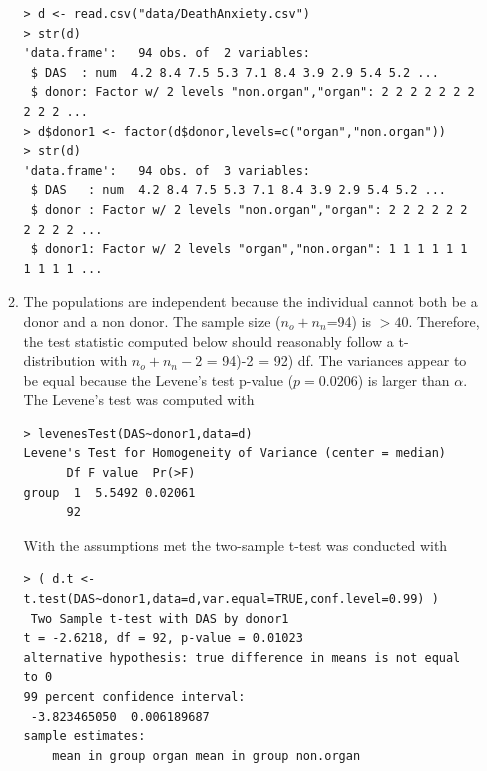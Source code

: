 \documentclass[10pt,openany]{book}\usepackage[]{graphicx}\usepackage[]{color}
\makeatletter
\newenvironment{kframe}{%
 \def\at@end@of@kframe{}%
 \ifinner\ifhmode%
  \def\at@end@of@kframe{\end{minipage}}%
  \begin{minipage}{\columnwidth}%
 \fi\fi%
 \def\FrameCommand##1{\hskip\@totalleftmargin \hskip-\fboxsep
 \colorbox{shadecolor}{##1}\hskip-\fboxsep
     \hskip-\linewidth \hskip-\@totalleftmargin \hskip\columnwidth}%
 \MakeFramed {\advance\hsize-\width
   \@totalleftmargin\z@ \linewidth\hsize
   \@setminipage}}%
 {\par\unskip\endMakeFramed%
 \at@end@of@kframe}
\newenvironment{knitrout}{}{} %
\makeatother
\begin{document}
\begin{itemize}
\begin{enumerate}
\begin{knitrout}
\color{fgcolor}\begin{kframe}
\begin{verbatim}
> d <- read.csv("data/DeathAnxiety.csv")
> str(d)
'data.frame':	94 obs. of  2 variables:
 $ DAS  : num  4.2 8.4 7.5 5.3 7.1 8.4 3.9 2.9 5.4 5.2 ...
 $ donor: Factor w/ 2 levels "non.organ","organ": 2 2 2 2 2 2 2 2 2 2 ...
> d$donor1 <- factor(d$donor,levels=c("organ","non.organ"))
> str(d)
'data.frame':	94 obs. of  3 variables:
 $ DAS   : num  4.2 8.4 7.5 5.3 7.1 8.4 3.9 2.9 5.4 5.2 ...
 $ donor : Factor w/ 2 levels "non.organ","organ": 2 2 2 2 2 2 2 2 2 2 ...
 $ donor1: Factor w/ 2 levels "organ","non.organ": 1 1 1 1 1 1 1 1 1 1 ...
\end{verbatim}
\end{kframe}
\end{knitrout}
      \item The populations are independent because the individual cannot both be a donor and a non donor.  The sample size ($n_{o}+n_{n}$=94) is $>40$.  Therefore, the test statistic computed below should reasonably follow a t-distribution with $n_{o}+n_{n}-2$ = 94)-2 = 92) df.  The variances appear to be equal because the Levene's test p-value ($p=0.0206$) is larger than $\alpha$.  The Levene's test was computed with
\begin{knitrout}
\color{fgcolor}\begin{kframe}
\begin{verbatim}
> levenesTest(DAS~donor1,data=d)
Levene's Test for Homogeneity of Variance (center = median)
      Df F value  Pr(>F)
group  1  5.5492 0.02061
      92                
\end{verbatim}
\end{kframe}
\end{knitrout}
With the assumptions met the two-sample t-test was conducted with
\begin{knitrout}
\color{fgcolor}\begin{kframe}
\begin{verbatim}
> ( d.t <- t.test(DAS~donor1,data=d,var.equal=TRUE,conf.level=0.99) )
 Two Sample t-test with DAS by donor1 
t = -2.6218, df = 92, p-value = 0.01023
alternative hypothesis: true difference in means is not equal to 0 
99 percent confidence interval:
 -3.823465050  0.006189687 
sample estimates:
    mean in group organ mean in group non.organ 

\end{verbatim}
\end{kframe}
\end{knitrout}
\end{enumerate}
\end{itemize}
\end{document}

